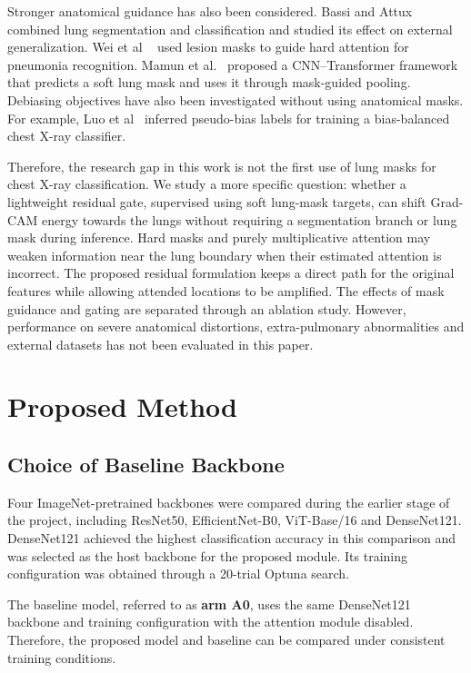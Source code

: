 \documentclass[sigconf,screen,nonacm]{acmart}
\begin{document}
Stronger anatomical guidance has also been considered. Bassi and Attux~\cite{bassi2022segmentation} combined lung segmentation and classification and studied its effect on external generalization. Wei et al ~\cite{wei2022deeppneumonia} used lesion masks to guide hard attention for pneumonia recognition. Mamun et al.~\cite{mamun2026beyond} proposed a CNN--Transformer framework that predicts a soft lung mask and uses it through mask-guided pooling. Debiasing objectives have also been investigated without using anatomical masks. For example, Luo et al~\cite{luo2022pseudobias} inferred pseudo-bias labels for training a bias-balanced chest X-ray classifier.

Therefore, the research gap in this work is not the first use of lung masks for chest X-ray classification. We study a more specific question: whether a lightweight residual gate, supervised using soft lung-mask targets, can shift Grad-CAM energy towards the lungs without requiring a segmentation branch or lung mask during inference. Hard masks and purely multiplicative attention may weaken information near the lung boundary when their estimated attention is incorrect. The proposed residual formulation keeps a direct path for the original features while allowing attended locations to be amplified. The effects of mask guidance and gating are separated through an ablation study. However, performance on severe anatomical distortions, extra-pulmonary abnormalities and external datasets has not been evaluated in this paper.

\section{Proposed Method}

\subsection{Choice of Baseline Backbone}

Four ImageNet-pretrained backbones were compared during the earlier stage of the project, including ResNet50, EfficientNet-B0, ViT-Base/16 and DenseNet121. DenseNet121 achieved the highest classification accuracy in this comparison and was selected as the host backbone for the proposed module. Its training configuration was obtained through a 20-trial Optuna search.

The baseline model, referred to as \textbf{arm A0}, uses the same DenseNet121 backbone and training configuration with the attention module disabled. Therefore, the proposed model and baseline can be compared under consistent training conditions.
\end{document}
